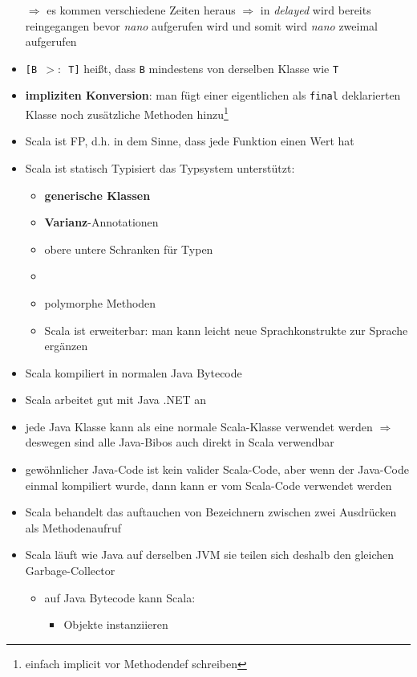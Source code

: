\begin{itemize}
  
  
  $\Rightarrow$ es kommen verschiedene Zeiten heraus $\Rightarrow$ in
  \textit{delayed} wird bereits reingegangen bevor \textit{nano} 
  aufgerufen wird und somit wird \textit{nano} zweimal aufgerufen
  \item \texttt{[B $>:$ T]} heißt, dass \texttt{B} mindestens von derselben
  Klasse wie \texttt{T}
  \item \textbf{impliziten Konversion}: man fügt einer eigentlichen als 
  \texttt{final} deklarierten Klasse noch
  zusätzliche Methoden hinzu\footnote{einfach implicit vor Methodendef
  schreiben}
  \item Scala ist FP, d.h. in dem Sinne, dass jede Funktion einen Wert hat
  \item Scala ist statisch Typisiert \und das Typsystem unterstützt:
  \begin{itemize}
    \item \textbf{generische Klassen}
    \item \textbf{Varianz}-Annotationen
    \item obere \und untere Schranken für Typen
    \item {}
    \item polymorphe Methoden
    \item Scala ist erweiterbar: man kann leicht neue Sprachkonstrukte
    zur Sprache ergänzen
  \end{itemize}
  \item Scala kompiliert in normalen Java Bytecode
  \item Scala arbeitet gut mit Java \und .NET an
  \item jede Java Klasse kann als eine normale Scala-Klasse verwendet werden
  $\Rightarrow$ deswegen sind alle Java-Bibos auch direkt in Scala verwendbar
  \item gewöhnlicher Java-Code ist kein valider Scala-Code, aber wenn der
  Java-Code einmal kompiliert wurde, dann kann er vom Scala-Code verwendet
  werden
  \item Scala behandelt das auftauchen von Bezeichnern zwischen zwei
  Ausdrücken als Methodenaufruf
  \item Scala läuft wie Java auf derselben JVM \und sie teilen sich deshalb
  den gleichen Garbage-Collector
  \begin{itemize}
    \item auf Java Bytecode kann Scala:
    \begin{itemize}
      \item Objekte instanziieren

\end{itemize}
\end{itemize}
\end{itemize}
